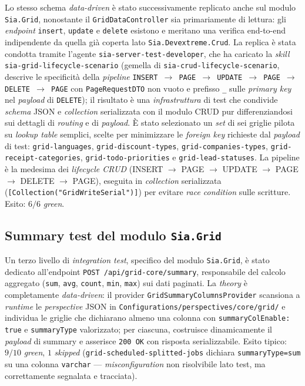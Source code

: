 Lo stesso schema \emph{data-driven} è stato successivamente replicato anche sul modulo \texttt{Sia.Grid}, nonostante il \texttt{GridDataController} sia primariamente di lettura: gli \emph{endpoint} \texttt{insert}, \texttt{update} e \texttt{delete} esistono e meritano una verifica end-to-end indipendente da quella già coperta lato \texttt{Sia.Devextreme.Crud}. La replica è stata condotta tramite l'agente \texttt{sia-server-test-developer}, che ha caricato la \emph{skill} \texttt{sia-grid-lifecycle-scenario} (gemella di \texttt{sia-crud-lifecycle-scenario}, descrive le specificità della \emph{pipeline} \texttt{INSERT $\rightarrow$ PAGE $\rightarrow$ UPDATE $\rightarrow$ PAGE $\rightarrow$ DELETE $\rightarrow$ PAGE} con \texttt{PageRequestDTO} non vuoto e prefisso \texttt{\_} sulle \emph{primary key} nel \emph{payload} di \texttt{DELETE}); il risultato è una \emph{infrastruttura} di test che condivide \emph{schema} JSON e \emph{collection} serializzata con il modulo CRUD pur differenziandosi sui dettagli di \emph{routing} e di \emph{payload}. È stato selezionato un \emph{set} di sei griglie pilota su \emph{lookup table} semplici, scelte per minimizzare le \emph{foreign key} richieste dal \emph{payload} di test: \texttt{grid-languages}, \texttt{grid-discount-types}, \texttt{grid-companies-types}, \texttt{grid-receipt-categories}, \texttt{grid-todo-priorities} e \texttt{grid-lead-statuses}. La pipeline è la medesima dei \emph{lifecycle CRUD} (INSERT $\rightarrow$ PAGE $\rightarrow$ UPDATE $\rightarrow$ PAGE $\rightarrow$ DELETE $\rightarrow$ PAGE), eseguita in \emph{collection} serializzata (\texttt{[Collection("GridWriteSerial")]}) per evitare \emph{race condition} sulle scritture. Esito: $6/6$ \emph{green}.

\subsection{Summary test del modulo \texttt{Sia.Grid}}

Un terzo livello di \emph{integration test}, specifico del modulo \texttt{Sia.Grid}, è stato dedicato all'endpoint \texttt{POST /api/grid-core/summary}, responsabile del calcolo aggregato (\texttt{sum}, \texttt{avg}, \texttt{count}, \texttt{min}, \texttt{max}) sui dati paginati. La \emph{theory} è completamente \emph{data-driven}: il provider \texttt{GridSummaryColumnsProvider} scansiona a \emph{runtime} le \emph{perspective} JSON in \texttt{Configurations/perspectives/core/grid/} e individua le griglie che dichiarano almeno una colonna con \texttt{summaryColEnable: true} e \texttt{summaryType} valorizzato; per ciascuna, costruisce dinamicamente il \emph{payload} di summary e asserisce \texttt{200 OK} con risposta serializzabile. Esito tipico: $9/10$ \emph{green}, $1$ \emph{skipped} (\texttt{grid-scheduled-splitted-jobs} dichiara \texttt{summaryType=sum} su una colonna \texttt{varchar} — \emph{misconfiguration} non risolvibile lato test, ma correttamente segnalata e tracciata).

